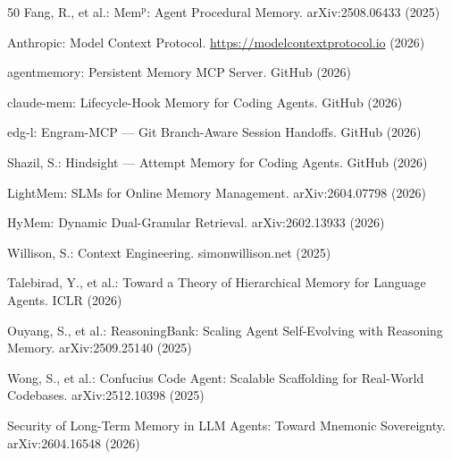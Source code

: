 \documentclass[runningheads]{llncs}
\begin{document}
\begin{thebibliography}{50}
Fang, R., et al.: Mem$^{\mathrm{p}}$: Agent Procedural Memory. arXiv:2508.06433 (2025)

Anthropic: Model Context Protocol. \url{https://modelcontextprotocol.io} (2026)

agentmemory: Persistent Memory MCP Server. GitHub (2026)

claude-mem: Lifecycle-Hook Memory for Coding Agents. GitHub (2026)

edg-l: Engram-MCP --- Git Branch-Aware Session Handoffs. GitHub (2026)

Shazil, S.: Hindsight --- Attempt Memory for Coding Agents. GitHub (2026)

LightMem: SLMs for Online Memory Management. arXiv:2604.07798 (2026)

HyMem: Dynamic Dual-Granular Retrieval. arXiv:2602.13933 (2026)

Willison, S.: Context Engineering. simonwillison.net (2025)

Talebirad, Y., et al.: Toward a Theory of Hierarchical Memory for Language Agents. ICLR (2026)

Ouyang, S., et al.: ReasoningBank: Scaling Agent Self-Evolving with Reasoning Memory. arXiv:2509.25140 (2025)

Wong, S., et al.: Confucius Code Agent: Scalable Scaffolding for Real-World Codebases. arXiv:2512.10398 (2025)

Security of Long-Term Memory in LLM Agents: Toward Mnemonic Sovereignty. arXiv:2604.16548 (2026)

\end{thebibliography}
\end{document}
